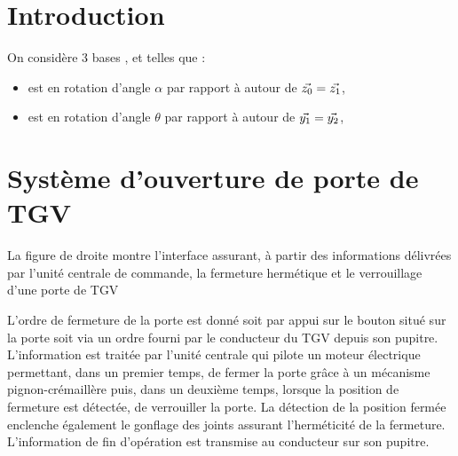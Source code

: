 \documentclass[a,p,exo]{D:/Dropbox/enseignement/CPGE/raphaelpoiree/classe/classe_kara}
\begin{document}


\section{Introduction}
\begin{frame}

On considère 3 bases ,  et  telles que :
\begin{itemize}
	\item {} est en rotation d'angle $\alpha$ par rapport à  autour de $\vec{z_{0}}=\vec{z_{1}}$,
	\item {} est en rotation d'angle $\theta$ par rapport à  autour de $\vec{y_{1}}=\vec{y_{2}}$,
\end{itemize}

\end{frame}


\section{Système d'ouverture de porte de TGV}

\begin{frame}
\begin{minipage}{0.4\textwidth}
La figure de droite montre l'interface assurant, à partir des informations délivrées par l'unité centrale de commande, la fermeture hermétique et le verrouillage d'une porte de TGV
\end{minipage}

L’ordre de fermeture de la porte est donné soit par appui sur le bouton situé sur la porte soit via un ordre fourni par le conducteur du TGV depuis son pupitre. L’information est traitée par l’unité centrale qui pilote un moteur électrique permettant, dans un premier temps, de fermer la porte grâce à un mécanisme pignon-crémaillère puis, dans un deuxième temps, lorsque la position de fermeture est détectée, de verrouiller la porte. La détection de la position fermée enclenche également le gonflage des joints assurant l’herméticité de la fermeture. L’information de fin d’opération est transmise au conducteur sur son pupitre. 

\end{frame}
\end{document}
